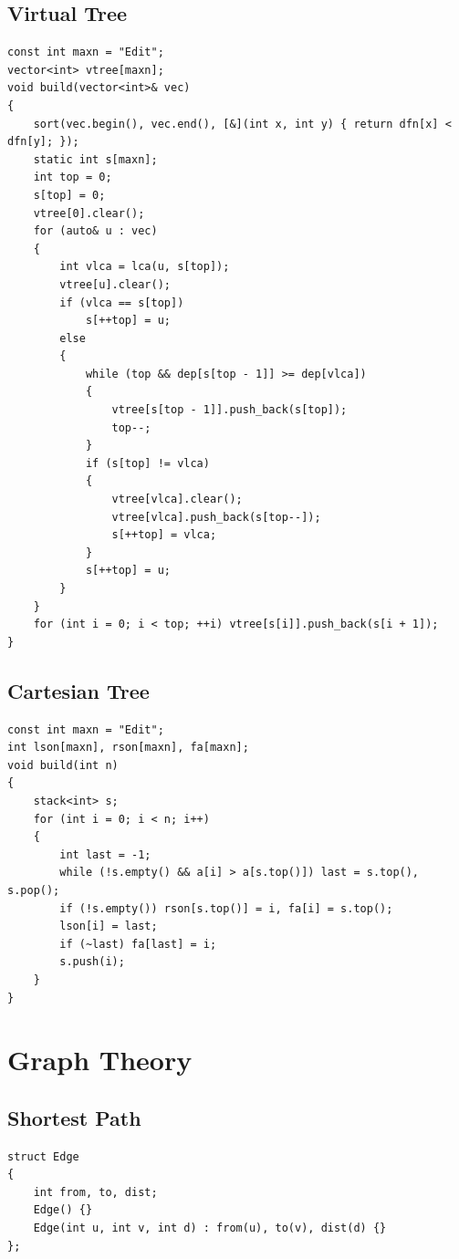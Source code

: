 \documentclass[twoside]{article}
\begin{document}
\subsection{Virtual Tree}
\begin{lstlisting}
const int maxn = "Edit";
vector<int> vtree[maxn];
void build(vector<int>& vec)
{
    sort(vec.begin(), vec.end(), [&](int x, int y) { return dfn[x] < dfn[y]; });
    static int s[maxn];
    int top = 0;
    s[top] = 0;
    vtree[0].clear();
    for (auto& u : vec)
    {
        int vlca = lca(u, s[top]);
        vtree[u].clear();
        if (vlca == s[top])
            s[++top] = u;
        else
        {
            while (top && dep[s[top - 1]] >= dep[vlca])
            {
                vtree[s[top - 1]].push_back(s[top]);
                top--;
            }
            if (s[top] != vlca)
            {
                vtree[vlca].clear();
                vtree[vlca].push_back(s[top--]);
                s[++top] = vlca;
            }
            s[++top] = u;
        }
    }
    for (int i = 0; i < top; ++i) vtree[s[i]].push_back(s[i + 1]);
}
\end{lstlisting}
\subsection{Cartesian Tree}
\begin{lstlisting}
const int maxn = "Edit";
int lson[maxn], rson[maxn], fa[maxn];
void build(int n)
{
    stack<int> s;
    for (int i = 0; i < n; i++)
    {
        int last = -1;
        while (!s.empty() && a[i] > a[s.top()]) last = s.top(), s.pop();
        if (!s.empty()) rson[s.top()] = i, fa[i] = s.top();
        lson[i] = last;
        if (~last) fa[last] = i;
        s.push(i);
    }
}\end{lstlisting}
\clearpage\section{Graph Theory}
\subsection{Shortest Path}
\begin{lstlisting}
struct Edge
{
    int from, to, dist;
    Edge() {}
    Edge(int u, int v, int d) : from(u), to(v), dist(d) {}
};\end{lstlisting}
\end{document}
